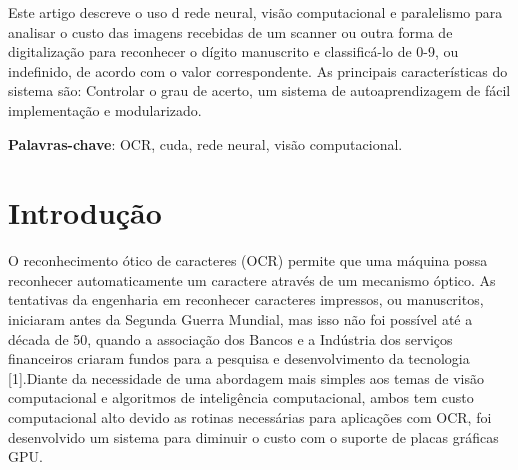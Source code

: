 \documentclass[
	article,			%
	11pt,				%
	oneside,			%
	a4paper,			%
	english,			%
	brazil,				%
	sumario=tradicional
	]{abntex2}
\begin{document}
\frenchspacing 


%
%
\maketitle

\begin{resumoumacoluna}
Este artigo descreve o uso d rede neural, visão computacional e  paralelismo
para analisar o custo  das imagens recebidas de um scanner ou outra forma de
digitalização para reconhecer o dígito manuscrito e classificá-lo de 0-9, ou
indefinido, de acordo com o valor correspondente. As principais características
do sistema são: Controlar o grau de acerto, um sistema de autoaprendizagem de
fácil implementação e modularizado.
 
 \vspace{\onelineskip}
 
 \noindent
 \textbf{Palavras-chave}: OCR, cuda, rede neural, visão computacional.
\end{resumoumacoluna}


\section*{Introdução}

O reconhecimento ótico de caracteres (OCR) permite que uma máquina possa
reconhecer automaticamente um caractere através de um mecanismo óptico. As
tentativas da engenharia em reconhecer caracteres impressos, ou manuscritos,
iniciaram antes da Segunda Guerra Mundial, mas isso não foi possível até a
década de 50, quando a associação dos Bancos e a Indústria dos serviços
financeiros criaram fundos para a pesquisa e desenvolvimento da tecnologia
[1].Diante da necessidade de uma abordagem mais simples aos temas de visão
computacional e algoritmos de inteligência computacional, ambos tem custo
computacional alto devido as rotinas necessárias para aplicações com OCR, foi
desenvolvido um sistema para diminuir o custo com o suporte de placas gráficas
GPU.
\end{document}
